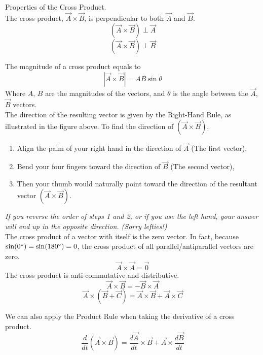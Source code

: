 \documentclass[11pt]{article}
\theoremstyle{gangnamstyle}{\newtheorem{definition}{Definition}[]}
\theoremstyle{gangnamstyle}{\newtheorem{example}{Example}[]}
\theoremstyle{gangnamstyle}{\newtheorem{problem}{Problem}[]}
\begin{document}
\begin{definition}
Properties of the Cross Product. \\
The cross product, $\Vec{A} \times \Vec{B}$, is perpendicular to both $\Vec{A}$ and $\Vec{B}$. 
\begin{equation}
(\Vec{A} \times \Vec{B}) \perp \Vec{A}
\end{equation}
\begin{equation}
(\Vec{A} \times \Vec{B}) \perp \Vec{B}
\end{equation}

The magnitude of a cross product equals to
\begin{equation}
|\Vec{A} \times \Vec{B}| = AB \sin\theta
\end{equation}
Where $A$, $B$ are the magnitudes of the vectors, and $\theta$ is the angle between the $\Vec{A}$, $\Vec{B}$ vectors. \\

The direction of the resulting vector is given by the Right-Hand Rule, as illustrated in the figure above. To find the direction of $(\Vec{A} \times \Vec{B})$, 
\begin{enumerate}
\item Align the palm of your right hand in the direction of $\Vec{A}$ (The first vector),
\item Bend your four fingers toward the direction of $\Vec{B}$ (The second vector),
\item Then your thumb would naturally point toward the direction of the resultant vector $(\Vec{A} \times \Vec{B})$. 
\end{enumerate}
\textit{If you reverse the order of steps 1 and 2, or if you use the left hand, your answer will end up in the opposite direction. (Sorry lefties!)} \\

The cross product of a vector with itself is the zero vector. In fact, because $\sin(0 \degree) = \sin(180 \degree) = 0$, the cross product of all parallel/antiparallel vectors are zero. 
\begin{equation}
\Vec{A} \times \Vec{A} = \Vec{0}
\end{equation}
The cross product is anti-commutative and distributive. 
\begin{equation}
\Vec{A} \times \Vec{B} = - \Vec{B} \times \Vec{A}
\end{equation}
\begin{equation}
\Vec{A} \times (\Vec{B} + \Vec{C}) = \Vec{A} \times \Vec{B} + \Vec{A} \times \Vec{C}
\end{equation}

We can also apply the Product Rule when taking the derivative of a cross product. 
\begin{equation}
\frac{d}{dt}(\Vec{A} \times \Vec{B}) = \frac{d\Vec{A}}{dt} \times \Vec{B} + \Vec{A} \times \frac{d\Vec{B}}{dt}
\end{equation}
\end{definition}
\end{document}
